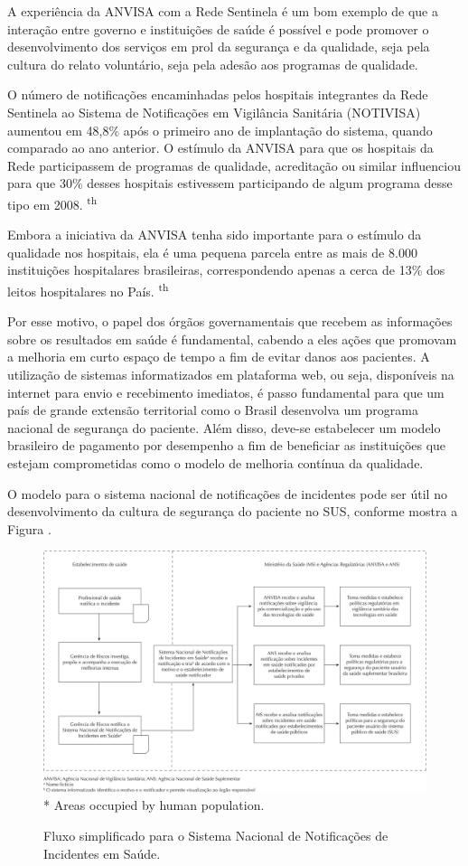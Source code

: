 \documentclass{article}
\begin{document}
A experiência da ANVISA com a Rede Sentinela é um bom exemplo de que a interação
entre
governo e instituições de saúde é possível e pode promover o desenvolvimento dos
serviços em
prol da segurança e da qualidade, seja pela cultura do relato voluntário, seja
pela adesão
aos programas de qualidade.

O número de notificações encaminhadas pelos hospitais integrantes da Rede
Sentinela ao
Sistema de Notificações em Vigilância Sanitária (NOTIVISA) aumentou em 48,8\%
após o primeiro
ano de implantação do sistema, quando comparado ao ano anterior. O estímulo da
ANVISA para
que os hospitais da Rede participassem de programas de qualidade, acreditação ou
similar
influenciou para que 30\% desses hospitais estivessem participando de algum
programa desse
tipo em 2008. \textsuperscript{th}

Embora a iniciativa da ANVISA tenha sido importante para o estímulo da qualidade
nos
hospitais, ela é uma pequena parcela entre as mais de 8.000 instituições
hospitalares
brasileiras, correspondendo apenas a cerca de 13\% dos leitos hospitalares no
País. \textsuperscript{th}

Por esse motivo, o papel dos órgãos governamentais que recebem as informações
sobre os
resultados em saúde é fundamental, cabendo a eles ações que promovam a melhoria
em curto
espaço de tempo a fim de evitar danos aos pacientes. A utilização de sistemas
informatizados
em plataforma web, ou seja, disponíveis na internet para envio e recebimento
imediatos, é
passo fundamental para que um país de grande extensão territorial como o Brasil
desenvolva
um programa nacional de segurança do paciente. Além disso, deve-se estabelecer
um modelo
brasileiro de pagamento por desempenho a fim de beneficiar as instituições que
estejam
comprometidas como o modelo de melhoria contínua da qualidade.

O modelo para o sistema nacional de notificações de incidentes pode ser útil no
desenvolvimento da cultura de segurança do paciente no SUS, conforme mostra a
Figura .

\begin{figure}[h]
\label{Figura}
\caption{Fluxo simplificado para o Sistema Nacional de Notificações de
Incidentes em
Saúde.}
\includegraphics[width=\textwidth]{0034-8910-rsp-47-04-0791-gf01.jpg}
* Areas occupied by human population.
\end{figure}
\end{document}
